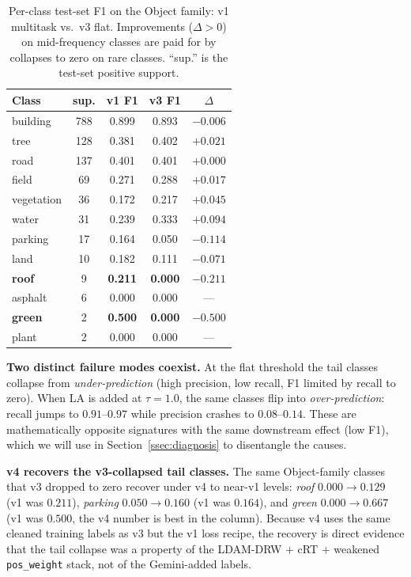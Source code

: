 \documentclass[journal]{IEEEtran}
\begin{document}
\begin{table}[!t]
  \caption{Per-class test-set F1 on the Object family: v1 multitask vs.\ v3 flat. Improvements ($\Delta {>} 0$) on mid-frequency classes are paid for by collapses to zero on rare classes. ``sup.'' is the test-set positive support.}
  \label{tab:object-classes}
  \centering
  \small
  \begin{tabular}{@{}lcccc@{}}
  \toprule
  Class & sup. & v1 F1 & v3 F1 & $\Delta$ \\
  \midrule
  building   & 788 & 0.899 & 0.893 & $-0.006$ \\
  tree       & 128 & 0.381 & 0.402 & $+0.021$ \\
  road       & 137 & 0.401 & 0.401 & $+0.000$ \\
  field      &  69 & 0.271 & 0.288 & $+0.017$ \\
  vegetation &  36 & 0.172 & 0.217 & $+0.045$ \\
  water      &  31 & 0.239 & 0.333 & $+0.094$ \\
  parking    &  17 & 0.164 & 0.050 & $-0.114$ \\
  land       &  10 & 0.182 & 0.111 & $-0.071$ \\
  \textbf{roof}    &   9 & \textbf{0.211} & \textbf{0.000} & $-0.211$ \\
  asphalt    &   6 & 0.000 & 0.000 & ---       \\
  \textbf{green}   &   2 & \textbf{0.500} & \textbf{0.000} & $-0.500$ \\
  plant      &   2 & 0.000 & 0.000 & ---       \\
  \bottomrule
  \end{tabular}
\end{table}

\textbf{Two distinct failure modes coexist.} At the flat threshold the tail classes collapse from \emph{under-prediction} (high precision, low recall, F1 limited by recall to zero). When LA is added at $\tau{=}1.0$, the same classes flip into \emph{over-prediction}: recall jumps to $0.91$--$0.97$ while precision crashes to $0.08$--$0.14$. These are mathematically opposite signatures with the same downstream effect (low F1), which we will use in Section~\ref{ssec:diagnosis} to disentangle the causes.

\textbf{v4 recovers the v3-collapsed tail classes.} The same Object-family classes that v3 dropped to zero recover under v4 to near-v1 levels: \emph{roof} $0.000\!\to\!0.129$ (v1 was $0.211$), \emph{parking} $0.050\!\to\!0.160$ (v1 was $0.164$), and \emph{green} $0.000\!\to\!0.667$ (v1 was $0.500$, the v4 number is best in the column). Because v4 uses the same cleaned training labels as v3 but the v1 loss recipe, the recovery is direct evidence that the tail collapse was a property of the LDAM-DRW $+$ cRT $+$ weakened \texttt{pos\_weight} stack, not of the Gemini-added labels.
\end{document}
